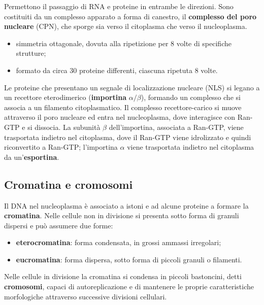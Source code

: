 Permettono il passaggio di RNA e proteine in entrambe le direzioni. Sono costituiti da un complesso apparato a forma di canestro, il \textbf{complesso del poro nucleare} (CPN), che sporge sia verso il citoplasma che verso il nucleoplasma.

\begin{itemize}
  \item simmetria ottagonale, dovuta alla ripetizione per 8 volte di specifiche strutture;
  \item formato da circa 30 proteine differenti, ciascuna ripetuta 8 volte.
\end{itemize}

Le proteine che presentano un segnale di localizzazione nucleare (NLS) si legano a un recettore eterodimerico (\textbf{importina} $\alpha/\beta$), formando un complesso che si associa a un filamento citoplasmatico. Il complesso recettore-carico si muove attraverso il poro nucleare ed entra nel nucleoplasma, dove interagisce con Ran-GTP e si dissocia. La subunità $\beta$ dell'importina, associata a Ran-GTP, viene trasportata indietro nel citoplasma, dove il Ran-GTP viene idrolizzato e quindi riconvertito a Ran-GTP; l'importina $\alpha$ viene trasportata indietro nel citoplasma da un'\textbf{esportina}.

\subsection{Cromatina e cromosomi}

Il DNA nel nucleoplasma è associato a istoni e ad alcune proteine a formare la \textbf{cromatina}. Nelle cellule non in divisione si presenta sotto forma di granuli dispersi e può assumere due forme:
\begin{itemize}
  \item \textbf{eterocromatina}: forma condensata, in grossi ammassi irregolari;
  \item \textbf{eucromatina}: forma dispersa, sotto forma di piccoli granuli o filamenti.
\end{itemize}
Nelle cellule in divisione la cromatina si condensa in piccoli bastoncini, detti \textbf{cromosomi}, capaci di autoreplicazione e di mantenere le proprie caratteristiche morfologiche attraverso successive divisioni cellulari.

